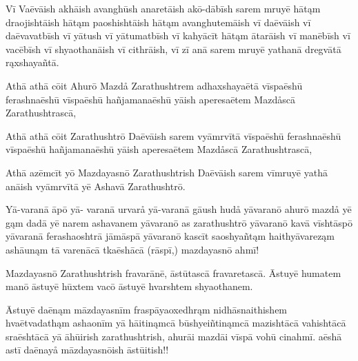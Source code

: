 \documentclass{book}
\begin{document}
\begin{pages}
\begin{Rightside}
Vī Vaēvāish akhāish avanghūsh anaretāish akō-dābīsh sarem mruyē hātąm draojishtāish hātąm paoshishtāish hātąm avanghutemāish vī daēvāish vī daēvavatbīsh vī yātush vī yātumatbīsh vī kahyācīt hātąm ātarāish vī manēbīsh vī vacēbīsh vī shyaothanāish vī cithrāish, vī zī anā sarem mruyē yathanā dregvātā rąxshayañtā. 

Athā athā cōit Ahurō Mazdå Zarathushtrem adhaxshayaētā vīspaēshū ferashnaēshū vīspaēshū hañjamanaēshū yāish aperesaētem Mazdåscā Zarathushtrascā, 

Athā athā cōit Zarathushtrō Daēvāish sarem vyāmrvītā vīspaēshū ferashnaēshū vīspaēshū hañjamanaēshū yāish aperesaētem Mazdåscā Zarathushtrascā,

Athā azēmcīt yō Mazdayasnō Zarathushtrish Daēvāish sarem vīmruyē yathā anāish vyāmrvītā yē Ashavā Zarathushtrō. 

Yā-varanā āpō yā- varanā urvarå yā-varanā gāush hudå yāvaranō ahurō mazdå yē gąm dadā yē narem ashavanem yāvaranō as zarathushtrō yāvaranō kavā vīshtāspō yāvaranā ferashaoshtrā jāmāspā yāvaranō kascīt saoshyañtąm haithyāvareząm ashāunąm tā varenācā tkaēshācā (rāspī,) mazdayasnō ahmī! 

Mazdayasnō Zarathushtrish fravarānē, āstūtascā fravaretascā. Āstuyē humatem manō āstuyē hūxtem vacō āstuyē hvarshtem shyaothanem. 

Āstuyē daēnąm māzdayasnīm fraspāyaoxedhrąm nidhāsnaithishem hvaētvadathąm ashaonīm yā hāitinąmcā būshyeiñtinąmcā mazishtācā vahishtācā sraēshtācā yā āhūirish zarathushtrish, ahurāi mazdāi vīspā vohū cinahmī. aēshā astī daēnayå māzdayasnōish āstūitish!! 

\endnumbering
\end{Rightside}

\end{pages}
\Pages
\end{document}
